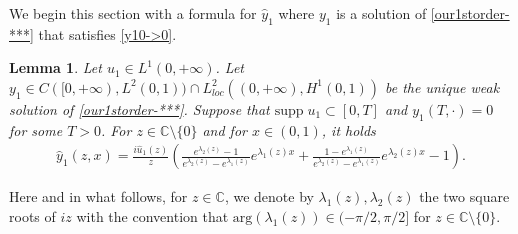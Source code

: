 \documentclass[11pt, reqno]{amsart}
\theoremstyle{plain}
\newtheorem{lemma}[thm]{Lemma}
\newtheorem{remark}{Remark}
\numberwithin{equation}{section}
\newcommand{\mR}{\mathbb{R}}
\newcommand{\mC}{\mathbb{C}}
\newcommand{\mN}{\mathbb{N}}
\newcommand{\hy}{\hat y}
\newcommand{\hu}{\hat u}
\begin{document}
We begin this section with a formula for $\hy_1$ where $y_1$ is a solution of \eqref{our1storder-***} that satisfies \eqref{y10->0}.

\begin{lemma}   \label{lem-y1}
Let $u_1 \in L^1(0, +\infty)$. Let $y_1 \in C([0, +\infty), L^2(0, 1)) \cap L^2_{loc}((0, +\infty), H^1(0, 1))$ be the unique weak solution of \eqref{our1storder-***}. Suppose that $\mathrm{supp} \; u_1 \subset [0, T]$ and $y_1(T, \cdot) = 0$ for some $T>0$. For $z \in \mC \setminus \{0\}$ and for $x \in (0, 1)$, it holds  
 \begin{align}	\label{Fourier-ODE}
    		\hy_1(z, x) = \frac{i \hu_1(z)}{z} \left(\frac{e^{\lambda_2(z)} - 1}{e^{\lambda_2(z)} - e^{\lambda_1(z)}} e^{\lambda_1(z) x} + \frac{1 - e^{\lambda_1(z)}}{e^{\lambda_2(z)} - e^{\lambda_1(z)}} e^{\lambda_2(z) x} - 1 \right).
    \end{align}
\end{lemma}


Here and in what follows, for $z \in \mathbb{C}$, we denote by $\lambda_1(z), \lambda_2(z)$ the two square roots of $iz$ with the convention that $\mathrm{arg}(\lambda_1(z)) \in (-\pi/2, \pi/2]$ for $z \in \mC \setminus \{0\}$. 
\end{document}
